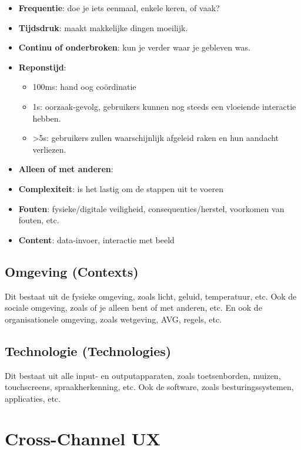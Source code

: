 \documentclass[nonacm, sigconf, balance=true]{acmart}
\begin{document}
    \begin{itemize}
        \item \textbf{Frequentie}: doe je iets eenmaal, enkele keren, of vaak?
        \item \textbf{Tijdsdruk}: maakt makkelijke dingen moeilijk.
        \item \textbf{Continu of onderbroken}: kun je verder waar je gebleven was.
        \item \textbf{Reponstijd}:
        \begin{itemize}
            \item 100ms: hand oog coördinatie
            \item 1s: oorzaak-gevolg, gebruikers kunnen nog steeds een vloeiende interactie hebben.
            \item >5s: gebruikers zullen waarschijnlijk afgeleid raken en hun aandacht verliezen.
        \end{itemize}
        \item \textbf{Alleen of met anderen}:
        \item \textbf{Complexiteit}: is het lastig om de stappen uit te voeren
        \item \textbf{Fouten}: fysieke/digitale veiligheid, consequenties/herstel, voorkomen van fouten, etc.
        \item \textbf{Content}: data-invoer, interactie met beeld
    \end{itemize}

    \subsection{Omgeving (Contexts)}
    Dit bestaat uit de fysieke omgeving, zoals licht, geluid, temperatuur, etc.
    Ook de sociale omgeving, zoals of je alleen bent of met anderen, etc.
    En ook de organisationele omgeving, zoals wetgeving, AVG, regels, etc.

    \subsection{Technologie (Technologies)}
    Dit bestaat uit alle input- en outputapparaten, zoals toetsenborden, muizen, touchscreens, spraakherkenning, etc.
    Ook de software, zoals besturingssystemen, applicaties, etc.


    \section{Cross-Channel UX}
\end{document}
